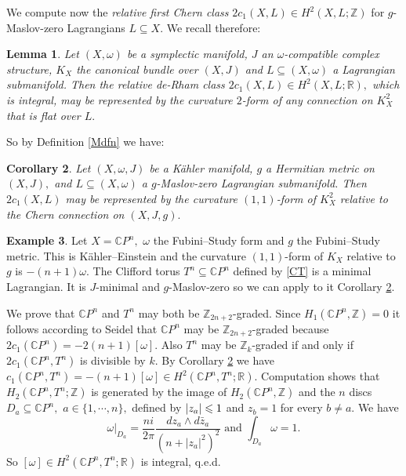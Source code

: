 \documentclass{article}
\theoremstyle{plain}%
\newtheorem{thm}{Theorem}[section]
\newtheorem{lem}[thm]{Lemma}
\newtheorem{cor}[thm]{Corollary}
\theoremstyle{definition}
\newtheorem{exam}[thm]{Example}
\numberwithin{equation}{section}
\numberwithin{figure}{section}
\def\eq{\eqref}
\def\l{\label}
\def\le{\leqslant\nobreak}
\def\CP{{\mathbin{\mathbb{C}}}P}
\def\R{{\mathbin{\mathbb R}}}
\def\Z{{\mathbin{\mathbb Z}}}
\def\om{\omega}
\def\w{\wedge}
\def\sb{\subseteq}
\begin{document}
We compute now the {\it relative first Chern class} $2c_1(X,L)\in H^2(X,L;\Z)$ for $g$-Maslov-zero Lagrangians $L\sb X.$
We recall therefore:
\begin{lem}
Let $(X,\om)$ be a symplectic manifold, $J$ an $\om$-compatible complex structure,
$K_X$ the canonical bundle over $(X,J)$
and $L\sb(X,\om)$ a Lagrangian submanifold.
Then the relative de-Rham class $2c_1(X,L)\in H^2(X,L;\R),$ which is integral, may be represented by the curvature $2$-form of any connection on $K_X^2$
that is flat over $L.$
\end{lem}
So by Definition \ref{Mdfn} we have: 
\begin{cor}\l{Masl}
Let $(X,\om,J)$ be a K\"ahler manifold,
$g$ a Hermitian metric on $(X,J),$
and $L\sb(X,\om)$ a $g$-Maslov-zero Lagrangian submanifold.
Then $2c_1(X,L)$ may be represented by
the curvature $(1,1)$-form of $K_X^2$ relative to the Chern connection on $(X,J,g).$
\end{cor}
\begin{exam}\l{ExCliff}
Let $X=\CP^n,$ $\om$ the Fubini--Study form and $g$ the Fubini--Study metric.
This is K\"ahler--Einstein and the curvature $(1,1)$-form of $K_X$ relative to $g$ is $-(n+1)\om.$
The Clifford torus $T^n\sb \CP^n$ defined by \eq{CT} is a minimal Lagrangian.
It is $J$-minimal and $g$-Maslov-zero so we can apply to it Corollary \ref{Masl}.

We prove that $\CP^n$ and $T^n$ may both be $\Z_{2n+2}$-graded.
Since $H_1(\CP^n,\Z)=0$ it follows according to Seidel \cite[Lemma 2.6]{Sd1} that $\CP^n$ may be $\Z_{2n+2}$-graded because $2c_1(\CP^n)=-2(n+1)[\om].$
Also $T^n$ may be $\Z_k$-graded if and only if $2c_1(\CP^n,T^n)$ is divisible by $k.$
By Corollary \ref{Masl} we have $c_1(\CP^n,T^n)=-(n+1)[\om]\in H^2(\CP^n,T^n;\R).$
Computation shows that $H_2(\CP^n,T^n;\Z)$ is generated by the image of $H_2(\CP^n,\Z)$
and the $n$ discs $D_a\sb\CP^n,$ $a\in\{1,\cdots,n\},$ defined by $|z_a|\le 1$ and $z_b =1$ for every $b\ne a.$
We have
\[\om|_{D_a}=\frac{ni}{2\pi}\frac{dz_a\w d\bar z_a}{(n+|z_a|^2)^2}
\text{ and }\int_{D_a}\om=1.\]
So $[\om]\in H^2(\CP^n,T^n;\R)$ is integral, q.e.d.
\end{exam}
\end{document}
